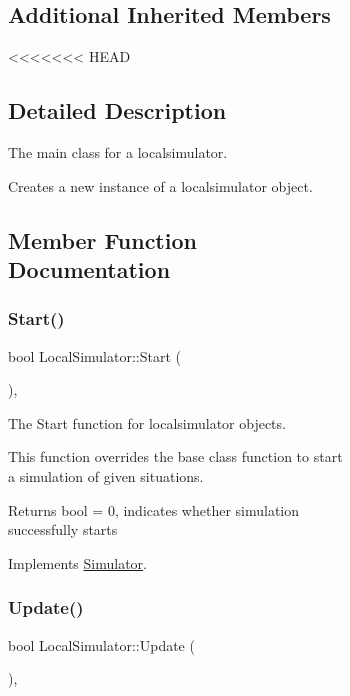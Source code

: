 \begin{figure}[H]
\begin{center}
\begin{figure}[H]
\begin{center}
\subsection*{Additional Inherited Members}


<<<<<<< HEAD
\subsection{Detailed Description}
The main class for a localsimulator. 

Creates a new instance of a localsimulator object. 

\subsection{Member Function Documentation}
\mbox{\label{classLocalSimulator_a380634942668855dd1da8276b270b362}} 
\subsubsection{\texorpdfstring{Start()}{Start()}}
{\footnotesize\ttfamily bool Local\+Simulator\+::\+Start (\begin{DoxyParamCaption}{ }\end{DoxyParamCaption})\hspace{0.3cm}{\ttfamily [override]}, {\ttfamily [virtual]}}



The Start function for localsimulator objects. 

This function overrides the base class function to start a simulation of given situations.

\begin{DoxyReturn}{Returns}
bool = 0, indicates whether simulation successfully starts 
\end{DoxyReturn}


Implements \hyperlink{classSimulator_a0db68bef442ba6061a5f38189bbe3512}{Simulator}.

\mbox{\label{classLocalSimulator_ac98ba1a401ad204dd5169934adb02684}} 
\subsubsection{\texorpdfstring{Update()}{Update()}}
{\footnotesize\ttfamily bool Local\+Simulator\+::\+Update (\begin{DoxyParamCaption}{ }\end{DoxyParamCaption})\hspace{0.3cm}{\ttfamily [override]}, {\ttfamily [virtual]}}




\end{center}
\end{figure}
\end{center}
\end{figure}

